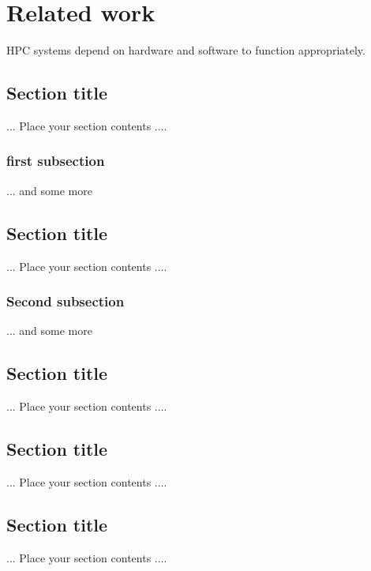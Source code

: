 \chapter{Related work} 

\ifpdf
    \graphicspath{{Chapter1/Chapter1Figs/PNG/}{Chapter1/Chapter1Figs/PDF/}{Chapter1/Chapter1Figs/}}
\else
    \graphicspath{{Chapter1/Chapter1Figs/EPS/}{Chapter1/Chapter1Figs/}}
\fi
\doublespacing
HPC systems depend on hardware and software to function appropriately. 

\section{Section title}
\label{sec:2.1}
... Place your section contents ....
\subsection{first subsection}
... and some more 

\section{Section title}
\label{sec:2.2}
... Place your section contents ....
\subsection{Second subsection }
... and some more 

\section{Section title}
\label{sec:2.3}
... Place your section contents ....

\section{Section title}
\label{sec:2.4}
... Place your section contents ....

\section{Section title}
\label{sec:2.5}
... Place your section contents ....

